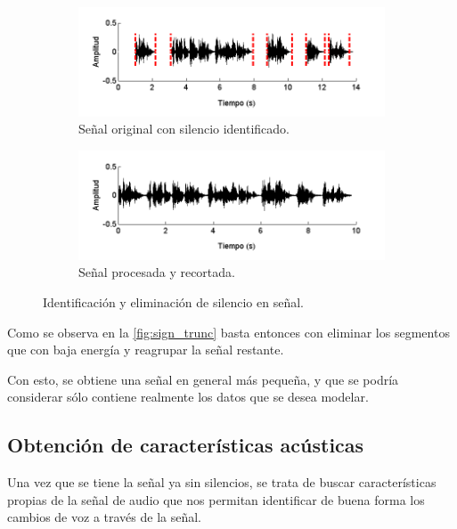 \begin{figure}[bth]
  \begin{subfigure}[b]{\textwidth}
    \includegraphics[width=0.9\linewidth]{gfx/chap2/signal-silence}
    \caption{Señal original con silencio identificado.}
    \label{fig:sign_silence}  
  \end{subfigure}

  \begin{subfigure}[b]{\textwidth}
    \includegraphics[width=0.9\linewidth]{gfx/chap2/signal-trunc}
    \caption{Señal procesada y recortada.}
    \label{fig:sign_trunc}  
  \end{subfigure}
  
  \caption{Identificación y eliminación de silencio en señal.}  
  \label{fig:sign_ident}  
\end{figure}

Como se observa en la \autoref{fig:sign_trunc} basta entonces con eliminar los segmentos que con baja energía y reagrupar la señal restante.

Con esto, se obtiene una señal en general más pequeña, y que se podría  considerar sólo contiene realmente los datos que se desea modelar.

\subsection{Obtención de características acústicas}

Una vez que se tiene la señal ya sin silencios, se trata de buscar características propias de la señal de audio que nos permitan identificar de buena forma los cambios de voz a través de la señal.

